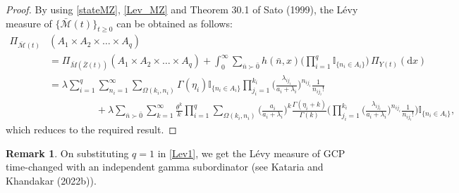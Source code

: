 \documentclass[12pt,oneside,reqno]{amsart}
\numberwithin{equation}{section}
\theoremstyle{definition}
\numberwithin{equation}{section}
\newtheorem{remark}{\bf Remark}[section]
\theoremstyle{remarkstyle}
\begin{document}
\begin{proof}
	By using \eqref{stateMZ}, \eqref{Lev_MZ} and Theorem 30.1 of Sato (1999), the L\'evy measure of $\{\bar{\mathscr{M}}(t)\}_{t\geq0}$ can be obtained as follows:
{\footnotesize	\begin{align*}
		\Pi_{\bar{\mathscr{M}}(t)}&(A_1 \times A_2\times\dots\times A_q)\\
		&=\Pi_{\bar{M}(\bar{Z}(t))}(A_1 \times A_2\times\dots\times A_q)
		+\int_{0}^{\infty}\sum_{\bar{n}\succ\bar{0}}h(\bar{n},x)\Big(\prod_{i=1}^{q}\mathbb{I}_{\{n_i\in A_i\}}\Big)\,\Pi_{Y(t)}(\mathrm{d}x)\\
		&=\lambda\sum_{i=1}^{q}\sum_{n_i=1}^{\infty}\sum_{\Omega(k_i,n_i)}\Gamma(\eta_i)\mathbb{I}_{\{n_i\in A_i\}}\prod_{j_i=1}^{k_i}\Big(\frac{\lambda_{ij_i}}{a_i+\lambda_i}\Big)^{n_{ij_i}}\frac{1}{n_{ij_i}!}\\
		&\hspace{2cm}+ \lambda\sum_{\bar{n}\succ \bar{0}}\sum_{k=1}^{\infty}\frac{\theta^k}{k}\prod_{i=1}^{q}
		\sum_{\Omega(k_i,n_i)}\Big(\frac{a_i}{a_i+\lambda_i}\Big)^{ k}\frac{\Gamma(\eta_i+ k)}{\Gamma(k)}
		\Big(\prod_{j_i=1}^{k_i}\Big(\frac{\lambda_{ij_i}}{a_i+\lambda_i}\Big)^{n_{ij_i}}\frac{1}{n_{ij_i}!}\Big)\mathbb{I}_{\{n_i\in A_i\}} ,
	\end{align*}}
which reduces to the required result.	
\end{proof}

\begin{remark}
On substituting $q=1$ in \eqref{Lev1}, we get the L\'evy measure of GCP time-changed with an independent gamma subordinator (see Kataria and Khandakar (2022b)). 
\end{remark}
\end{document}
